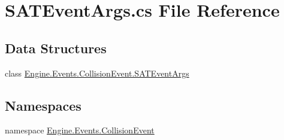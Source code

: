 \hypertarget{a00050}{}\section{S\+A\+T\+Event\+Args.\+cs File Reference}
\label{a00050}
\subsection*{Data Structures}
\begin{DoxyCompactItemize}
\item 
class \hyperlink{a00358}{Engine.\+Events.\+Collision\+Event.\+S\+A\+T\+Event\+Args}
\end{DoxyCompactItemize}
\subsection*{Namespaces}
\begin{DoxyCompactItemize}
\item 
namespace \hyperlink{a00245}{Engine.\+Events.\+Collision\+Event}
\end{DoxyCompactItemize}
